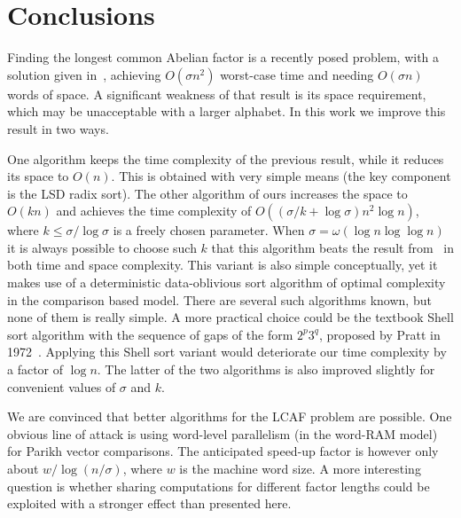 \documentclass{llncs}
\begin{document}
\section{Conclusions}
\noindent 
Finding the longest common Abelian factor is a recently posed problem, 
with a solution given in~\cite{AILR2015}, 
achieving $O(\sigma n^2)$ worst-case time and 
needing $O(\sigma n)$ words of space.
A significant weakness of that result is its space requirement, 
which may be unacceptable with a larger alphabet.
In this work we improve this result in two ways.

One algorithm keeps the time complexity of the previous result, 
while it reduces its space to $O(n)$.
This is obtained with very simple means (the key component is 
the LSD radix sort).
The other algorithm of ours increases the space to $O(kn)$
and achieves the time complexity of $O( (\sigma/k + \log\sigma)n^2 \log n)$, 
where $k \leq \sigma/\log\sigma$ is a freely chosen parameter.
When $\sigma = \omega(\log n \log\log n)$ it is always possible to 
choose such $k$ that this algorithm beats the result from~\cite{AILR2015} 
in both time and space complexity.
This variant is also simple conceptually, yet it makes use 
of a deterministic data-oblivious sort algorithm of optimal complexity 
in the comparison based model.
There are several such algorithms known, but none of them is really simple. 
A more practical choice could be the textbook Shell sort algorithm 
with the sequence of gaps of the form $2^p 3^q$, proposed 
by Pratt in 1972~\cite{P1972}.
Applying this Shell sort variant would deteriorate our time complexity 
by a factor of $\log n$.
The latter of the two algorithms is also improved slightly 
for convenient values of $\sigma$ and $k$.

We are convinced that better algorithms for the LCAF problem are possible.
One obvious line of attack is using word-level parallelism
(in the word-RAM model) for Parikh vector comparisons.
The anticipated speed-up factor is however only about $w / \log(n/\sigma)$, 
where $w$ is the machine word size.
A more interesting question is whether sharing computations 
for different factor lengths could be exploited with a stronger effect 
than presented here.




\end{document}
